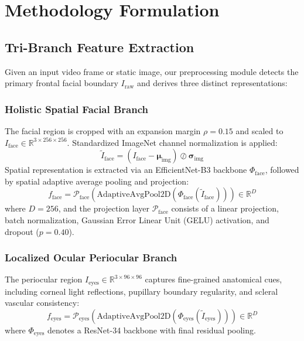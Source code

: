 \documentclass[journal,10pt,twocolumn]{IEEEtran}
\begin{document}
\section{Methodology Formulation}

\subsection{Tri-Branch Feature Extraction}
Given an input video frame or static image, our preprocessing module detects the primary frontal facial boundary $I_{\text{raw}}$ and derives three distinct representations:

\subsubsection{Holistic Spatial Facial Branch}
The facial region is cropped with an expansion margin $\rho = 0.15$ and scaled to $I_{\text{face}} \in \mathbb{R}^{3 \times 256 \times 256}$. Standardized ImageNet channel normalization is applied:
\begin{equation}
    \tilde{I}_{\text{face}} = (I_{\text{face}} - \boldsymbol{\mu}_{\text{img}}) \oslash \boldsymbol{\sigma}_{\text{img}}
\end{equation}
Spatial representation is extracted via an EfficientNet-B3 backbone $\Phi_{\text{face}}$, followed by spatial adaptive average pooling and projection:
\begin{equation}
    f_{\text{face}} = \mathcal{P}_{\text{face}}(\text{AdaptiveAvgPool2D}(\Phi_{\text{face}}(\tilde{I}_{\text{face}}))) \in \mathbb{R}^{D}
\end{equation}
where $D = 256$, and the projection layer $\mathcal{P}_{\text{face}}$ consists of a linear projection, batch normalization, Gaussian Error Linear Unit (GELU) activation, and dropout ($p = 0.40$).

\subsubsection{Localized Ocular Periocular Branch}
The periocular region $I_{\text{eyes}} \in \mathbb{R}^{3 \times 96 \times 96}$ captures fine-grained anatomical cues, including corneal light reflections, pupillary boundary regularity, and scleral vascular consistency:
\begin{equation}
    f_{\text{eyes}} = \mathcal{P}_{\text{eyes}}(\text{AdaptiveAvgPool2D}(\Phi_{\text{eyes}}(\tilde{I}_{\text{eyes}}))) \in \mathbb{R}^{D}
\end{equation}
where $\Phi_{\text{eyes}}$ denotes a ResNet-34 backbone with final residual pooling.
\end{document}
